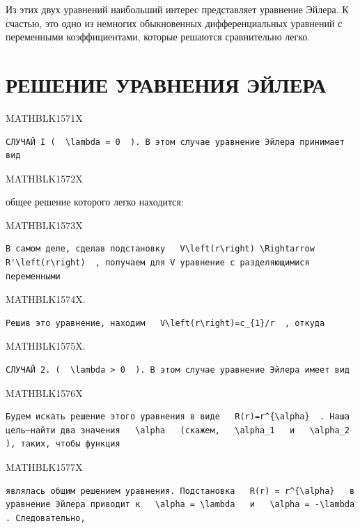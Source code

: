 \documentclass[
]{article}
\begin{document}
Из этих двух уравнений наибольший интерес представляет уравнение Эйлера.
К счастью, это одно из немногих обыкновенных дифференциальных уравнений
с переменными коэффициентами, которые решаются сравнительно легко.

\section{РЕШЕНИЕ УРАВНЕНИЯ
ЭЙЛЕРА}\label{ux440ux435ux448ux435ux43dux438ux435-ux443ux440ux430ux432ux43dux435ux43dux438ux44f-ux44dux439ux43bux435ux440ux430}

MATHBLK1571X

\begin{verbatim}
СЛУЧАЙ I (  \lambda = 0  ). В этом случае уравнение Эйлера принимает вид
\end{verbatim}

MATHBLK1572X

общее решение которого легко находится:

MATHBLK1573X

\begin{verbatim}
В самом деле, сделав подстановку   V\left(r\right) \Rightarrow R'\left(r\right)  , получаем для V уравнение с разделяющимися переменными
\end{verbatim}

MATHBLK1574X.

\begin{verbatim}
Решив это уравнение, находим   V\left(r\right)=c_{1}/r  , откуда
\end{verbatim}

MATHBLK1575X.

\begin{verbatim}
СЛУЧАЙ 2. (  \lambda > 0  ). В этом случае уравнение Эйлера имеет вид
\end{verbatim}

MATHBLK1576X

\begin{verbatim}
Будем искать решение этого уравнения в виде   R(r)=r^{\alpha}  . Наша цель—найти два значения   \alpha   (скажем,   \alpha_1   и   \alpha_2  ), таких, чтобы функция
\end{verbatim}

MATHBLK1577X

\begin{verbatim}
являлась общим решением уравнения. Подстановка   R(r) = r^{\alpha}   в уравнение Эйлера приводит к   \alpha = \lambda   и   \alpha = -\lambda  . Следовательно,
\end{verbatim}
\end{document}
